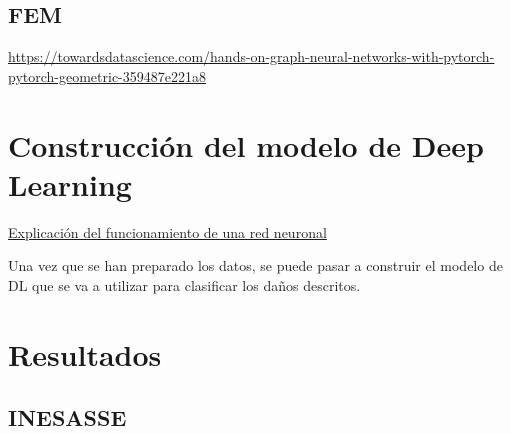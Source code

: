     
    
\subsection{FEM}
    
    
    

\url{https://towardsdatascience.com/hands-on-graph-neural-networks-with-pytorch-pytorch-geometric-359487e221a8}




\section{Construcción del modelo de Deep Learning}

\hyperref[sec:funcionamiento_DL]{Explicación del funcionamiento de una red neuronal}


Una vez que se han preparado los datos, se puede pasar a construir el modelo de DL que se va a utilizar para clasificar los daños descritos.




\section{Resultados}

\subsection{INESASSE}

